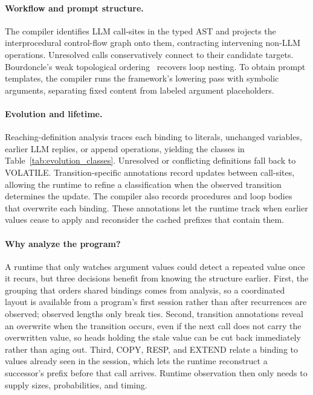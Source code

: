 \paragraph{Workflow and prompt structure.}
The compiler identifies LLM call-sites in the typed AST and projects the interprocedural control-flow graph onto them, contracting intervening non-LLM operations. Unresolved calls conservatively connect to their candidate targets. Bourdoncle's weak topological ordering~\cite{bourdoncle1993efficient} recovers loop nesting. To obtain prompt templates, the compiler runs the framework's lowering pass with symbolic arguments, separating fixed content from labeled argument placeholders.

\paragraph{Evolution and lifetime.}
Reaching-definition analysis traces each binding to literals, unchanged variables, earlier LLM replies, or append operations, yielding the classes in Table~\ref{tab:evolution_classes}. Unresolved or conflicting definitions fall back to VOLATILE. Transition-specific annotations record updates between call-sites, allowing the runtime to refine a classification when the observed transition determines the update. The compiler also records procedures and loop bodies that overwrite each binding. These annotations let the runtime track when earlier values cease to apply and reconsider the cached prefixes that contain them.

\paragraph{Why analyze the program?}
A runtime that only watches argument values could detect a repeated value once it recurs, but three decisions benefit from knowing the structure earlier. First, the grouping that orders shared bindings comes from analysis, so a coordinated layout is available from a program's first session rather than after recurrences are observed; observed lengths only break ties. Second, transition annotations reveal an overwrite when the transition occurs, even if the next call does not carry the overwritten value, so heads holding the stale value can be cut back immediately rather than aging out. Third, COPY, RESP, and EXTEND relate a binding to values already seen in the session, which lets the runtime reconstruct a successor's prefix before that call arrives. Runtime observation then only needs to supply sizes, probabilities, and timing.

